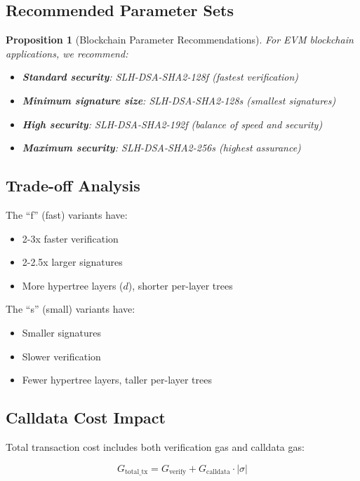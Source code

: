 \documentclass[11pt,a4paper]{article}
\newtheorem{proposition}{Proposition}
\begin{document}
\subsection{Recommended Parameter Sets}

\begin{proposition}[Blockchain Parameter Recommendations]
For EVM blockchain applications, we recommend:
\begin{itemize}
    \item \textbf{Standard security}: SLH-DSA-SHA2-128f (fastest verification)
    \item \textbf{Minimum signature size}: SLH-DSA-SHA2-128s (smallest signatures)
    \item \textbf{High security}: SLH-DSA-SHA2-192f (balance of speed and security)
    \item \textbf{Maximum security}: SLH-DSA-SHA2-256s (highest assurance)
\end{itemize}
\end{proposition}

\subsection{Trade-off Analysis}

The ``f'' (fast) variants have:
\begin{itemize}
    \item 2-3x faster verification
    \item 2-2.5x larger signatures
    \item More hypertree layers ($d$), shorter per-layer trees
\end{itemize}

The ``s'' (small) variants have:
\begin{itemize}
    \item Smaller signatures
    \item Slower verification
    \item Fewer hypertree layers, taller per-layer trees
\end{itemize}

\subsection{Calldata Cost Impact}

Total transaction cost includes both verification gas and calldata gas:

\begin{equation}
G_{\text{total\_tx}} = G_{\text{verify}} + G_{\text{calldata}} \cdot |\sigma|
\end{equation}
\end{document}
